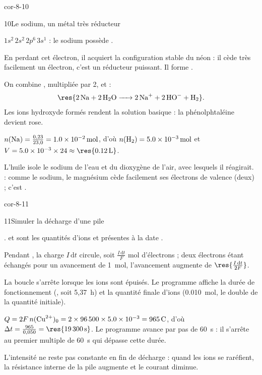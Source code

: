 \begin{blocLivre}{cor-8-10}
\begin{corrige}{10}{Le sodium, un métal très réducteur}
\begin{questions}
\item $1s^2\,2s^2\,2p^6\,3s^1$ : le sodium possède .
\item En perdant cet électron, il acquiert la configuration stable du néon : il cède très facilement un électron, c'est
un réducteur puissant. Il forme .
\item On combine , multipliée par 2, et  :
\[\res{\ce{2 Na + 2 H2O -> 2 Na+ + 2 HO- + H2}}.\]
Les ions hydroxyde formés rendent la solution basique : la phénolphtaléine devient rose.
\item $n(\ce{Na})=\frac{0{,}23}{23{,}0}=\qty{1,0e-2}{mol}$, d'où $n(\ce{H2})=\qty{5,0e-3}{mol}$ et
$V=\num{5.0e-3}\times24\approx\res{\qty{0,12}{L}}$.
\item L'huile isole le sodium de l'eau et du dioxygène de l'air, avec lesquels il réagirait.  : comme
le sodium, le magnésium cède facilement ses électrons de valence (deux) ; c'est .
\end{questions}
\end{corrige}
\end{blocLivre}
\begin{blocLivre}{cor-8-11}
\begin{corrige}{11}{Simuler la décharge d'une pile}
\begin{questions}
\item {}.  et  sont les quantités d'ions  et 
présentes à la date .
\item Pendant , la charge $I\,\mathrm{d}t$ circule, soit $\frac{I\,\mathrm{d}t}{F}$ mol d'électrons ; deux électrons étant
échangés pour un avancement de 1~mol, l'avancement augmente de $\res{\frac{I\,\mathrm{d}t}{2F}}$.
\item La boucle s'arrête lorsque les ions  sont épuisés. Le programme affiche la durée de fonctionnement
(, soit 5,37~h) et la quantité finale d'ions  (\qty{0,010}{mol}, le double de la
quantité initiale).
\item $Q=2F\,n(\ce{Cu^2+})_0=2\times\num{96500}\times\num{5.0e-3}=\qty{965}{C}$, d'où $\Delta t=\frac{965}{0{,}050}=\res{\qty{19300}{s}}$.
Le programme avance par pas de 60~s : il s'arrête au premier multiple de 60~s qui dépasse cette durée.
\item L'intensité ne reste pas constante en fin de décharge : quand les ions  se raréfient, la résistance
interne de la pile augmente et le courant diminue.
\end{questions}
\end{corrige}
\end{blocLivre}
